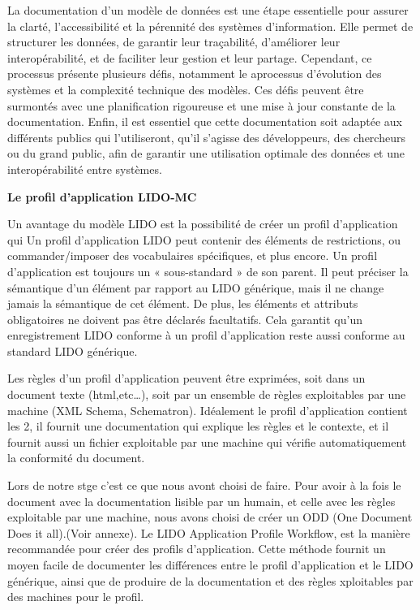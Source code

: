 La documentation d’un modèle de données est une étape essentielle pour assurer la clarté, l’accessibilité et la pérennité des systèmes d’information. Elle permet de structurer les données, de garantir leur traçabilité, d’améliorer leur interopérabilité, et de faciliter leur gestion et leur partage. Cependant, ce processus présente plusieurs défis, notamment le aprocessus d’évolution des systèmes et la complexité technique des modèles. Ces défis peuvent être surmontés avec une planification rigoureuse et une mise à jour constante de la documentation. Enfin, il est essentiel que cette documentation soit adaptée aux différents publics qui l’utiliseront, qu’il s’agisse des développeurs, des chercheurs ou du grand public, afin de garantir une utilisation optimale des données et une interopérabilité entre systèmes.\newline

\textbf{Le profil d’application LIDO-MC}\newline

Un avantage du modèle LIDO est la possibilité de créer un profil d'application qui 
Un profil d’application LIDO peut contenir des éléments de restrictions, ou commander/imposer des vocabulaires spécifiques, et plus encore.
Un profil d’application est toujours un « sous-standard » de son parent. Il peut préciser la sémantique d’un élément par rapport au LIDO générique, mais il ne change jamais la sémantique de cet élément.
De plus, les éléments et attributs obligatoires ne doivent pas être déclarés facultatifs. Cela garantit qu’un enregistrement LIDO conforme à un profil d'application reste aussi conforme au standard LIDO générique.\newline

Les règles d’un profil d’application peuvent être exprimées, soit dans un document texte (html,etc…), soit par un ensemble de règles exploitables par une machine (XML Schema, Schematron).
Idéalement le profil d’application contient les 2, il fournit une documentation qui explique les règles et le contexte, et il fournit aussi un fichier exploitable par une machine qui vérifie automatiquement la conformité du document.\newline

Lors de notre stge c'est ce que nous avont choisi de faire. Pour avoir à la fois le document avec la documentation lisible par un humain, et celle avec les règles exploitable par une machine, nous avons choisi de créer un ODD (One Document Does it all).(Voir annexe).
Le LIDO Application Profile Workflow, est la manière recommandée pour créer des profils d’application. Cette méthode fournit un moyen facile de documenter les différences entre le profil d'application et le LIDO générique, ainsi que de produire de la documentation et des règles xploitables par des machines pour le profil. \newline


